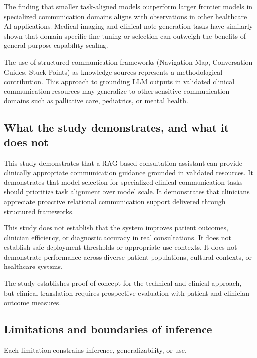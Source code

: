 The finding that smaller task-aligned models outperform larger frontier models in specialized communication domains aligns with observations in other healthcare AI applications. Medical imaging and clinical note generation tasks have similarly shown that domain-specific fine-tuning or selection can outweigh the benefits of general-purpose capability scaling.

The use of structured communication frameworks (Navigation Map, Conversation Guides, Stuck Points) as knowledge sources represents a methodological contribution. This approach to grounding LLM outputs in validated clinical communication resources may generalize to other sensitive communication domains such as palliative care, pediatrics, or mental health.

\subsection{What the study demonstrates, and what it does not}

This study demonstrates that a RAG-based consultation assistant can provide clinically appropriate communication guidance grounded in validated resources. It demonstrates that model selection for specialized clinical communication tasks should prioritize task alignment over model scale. It demonstrates that clinicians appreciate proactive relational communication support delivered through structured frameworks.

This study does not establish that the system improves patient outcomes, clinician efficiency, or diagnostic accuracy in real consultations. It does not establish safe deployment thresholds or appropriate use contexts. It does not demonstrate performance across diverse patient populations, cultural contexts, or healthcare systems.

The study establishes proof-of-concept for the technical and clinical approach, but clinical translation requires prospective evaluation with patient and clinician outcome measures.

\subsection{Limitations and boundaries of inference}\label{sec:discussion_limitations}

Each limitation constrains inference, generalizability, or use.

